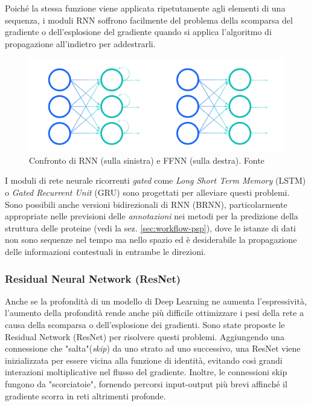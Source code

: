 \par Poiché la stessa funzione viene applicata ripetutamente agli elementi di una sequenza, i moduli RNN soffrono facilmente del problema della scomparsa del gradiente o dell'esplosione del gradiente quando si applica l'algoritmo di propagazione all'indietro per addestrarli. \\

\begin{figure}[!htb]
	\centering
	\includegraphics[scale=0.3]{images/rnn.png}
	\caption{Confronto di RNN (sulla sinistra) e FFNN (sulla destra). Fonte\cite{rnnIBM}}
	\label{fig:rnn}
\end{figure}

\par I moduli di rete neurale ricorrenti \textit{gated }come \textit{Long Short Term Memory }(LSTM) o \textit{Gated Recurrent Unit }(GRU) sono progettati per alleviare questi problemi. Sono possibili anche versioni bidirezionali di RNN (BRNN), particolarmente appropriate nelle previsioni delle \textit{annotazioni} nei metodi per la predizione della struttura delle proteine (vedi la sez. \ref{sec:workflow-psp}), dove le istanze di dati non sono sequenze nel tempo ma nello spazio ed è desiderabile la propagazione delle informazioni contestuali in entrambe le direzioni.

\subsubsection{Residual Neural Network (ResNet)}

Anche se la profondità di un modello di Deep Learning ne aumenta l'espressività, l'aumento della profondità rende anche più difficile ottimizzare i pesi della rete a causa della scomparsa o dell'esplosione dei gradienti. Sono state proposte le Residual Network (ResNet) per risolvere questi problemi. Aggiungendo una connessione che "salta"(\textit{skip}) da uno strato ad uno successivo, una ResNet viene inizializzata per essere vicina alla funzione di identità, evitando così grandi interazioni moltiplicative nel flusso del gradiente. Inoltre, le connessioni skip fungono da "scorciatoie", fornendo percorsi input-output più brevi affinché il gradiente scorra in reti altrimenti profonde.

